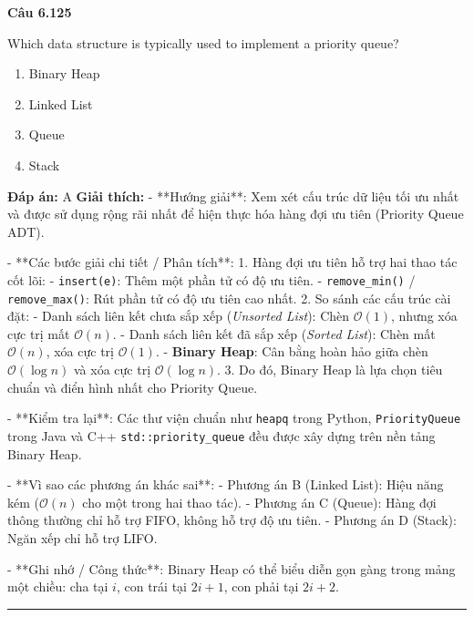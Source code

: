 \documentclass[11pt,a4paper]{article}
\newenvironment{question}[1]{%
  \par\vspace{1em}\noindent\textbf{\large Câu #1}\par\vspace{0.4em}
}{%
  \par\vspace{1em}\hrule\vspace{0.6em}
}
\newenvironment{choices}{%
  \begin{enumerate}[label=\textbf{\Alph*.},leftmargin=2.2em,itemsep=2pt,topsep=3pt]
}{%
  \end{enumerate}
}
\newcommand{\choice}{\item}
\begin{document}
\begin{question}{6.125}
Which data structure is typically used to implement a priority queue?
\begin{choices}
\choice Binary Heap
\choice Linked List
\choice Queue
\choice Stack
\end{choices}
\textbf{Đáp án:} A
\textbf{Giải thích:} - **Hướng giải**:
Xem xét cấu trúc dữ liệu tối ưu nhất và được sử dụng rộng rãi nhất để hiện thực hóa hàng đợi ưu tiên (Priority Queue ADT).


- **Các bước giải chi tiết / Phân tích**:
1. Hàng đợi ưu tiên hỗ trợ hai thao tác cốt lõi:
   - \texttt{insert(e)}: Thêm một phần tử có độ ưu tiên.
   - \texttt{remove\_min()} / \texttt{remove\_max()}: Rút phần tử có độ ưu tiên cao nhất.
2. So sánh các cấu trúc cài đặt:
   - Danh sách liên kết chưa sắp xếp (\textit{Unsorted List}): Chèn \(\mathcal{O}(1)\), nhưng xóa cực trị mất \(\mathcal{O}(n)\).
   - Danh sách liên kết đã sắp xếp (\textit{Sorted List}): Chèn mất \(\mathcal{O}(n)\), xóa cực trị \(\mathcal{O}(1)\).
   - \textbf{Binary Heap}: Cân bằng hoàn hảo giữa chèn \(\mathcal{O}(\log n)\) và xóa cực trị \(\mathcal{O}(\log n)\).
3. Do đó, Binary Heap là lựa chọn tiêu chuẩn và điển hình nhất cho Priority Queue.


- **Kiểm tra lại**:
Các thư viện chuẩn như \texttt{heapq} trong Python, \texttt{PriorityQueue} trong Java và C++ \texttt{std::priority\_queue} đều được xây dựng trên nền tảng Binary Heap.


- **Vì sao các phương án khác sai**:
- Phương án B (Linked List): Hiệu năng kém (\(\mathcal{O}(n)\) cho một trong hai thao tác).
- Phương án C (Queue): Hàng đợi thông thường chỉ hỗ trợ FIFO, không hỗ trợ độ ưu tiên.
- Phương án D (Stack): Ngăn xếp chỉ hỗ trợ LIFO.


- **Ghi nhớ / Công thức**:
Binary Heap có thể biểu diễn gọn gàng trong mảng một chiều: cha tại \(i\), con trái tại \(2i+1\), con phải tại \(2i+2\).
\end{question}
\end{document}
